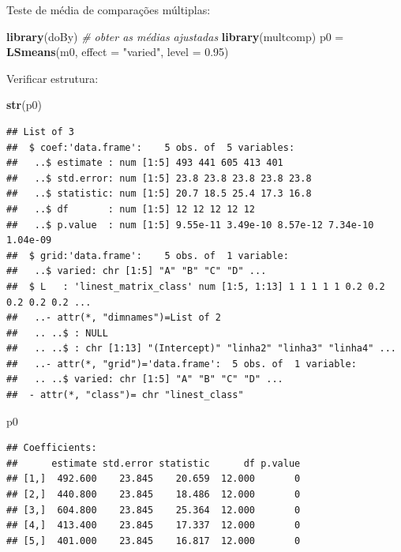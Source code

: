 \documentclass[
]{book}
\newenvironment{Shaded}{\begin{snugshade}}{\end{snugshade}}
\newcommand{\CommentTok}[1]{\textcolor[rgb]{0.56,0.35,0.01}{\textit{#1}}}
\newcommand{\DataTypeTok}[1]{\textcolor[rgb]{0.13,0.29,0.53}{#1}}
\newcommand{\FloatTok}[1]{\textcolor[rgb]{0.00,0.00,0.81}{#1}}
\newcommand{\KeywordTok}[1]{\textcolor[rgb]{0.13,0.29,0.53}{\textbf{#1}}}
\newcommand{\NormalTok}[1]{#1}
\newcommand{\StringTok}[1]{\textcolor[rgb]{0.31,0.60,0.02}{#1}}
\begin{document}
Teste de média de comparações múltiplas:

\begin{Shaded}
\begin{Highlighting}[]
\KeywordTok{library}\NormalTok{(doBy) }\CommentTok{# obter as médias ajustadas }
\KeywordTok{library}\NormalTok{(multcomp)}
\NormalTok{p0 =}\StringTok{ }\KeywordTok{LSmeans}\NormalTok{(m0, }\DataTypeTok{effect =} \StringTok{"varied"}\NormalTok{, }\DataTypeTok{level =} \FloatTok{0.95}\NormalTok{)}
\end{Highlighting}
\end{Shaded}

Verificar estrutura:

\begin{Shaded}
\begin{Highlighting}[]
\KeywordTok{str}\NormalTok{(p0)}
\end{Highlighting}
\end{Shaded}

\begin{verbatim}
## List of 3
##  $ coef:'data.frame':    5 obs. of  5 variables:
##   ..$ estimate : num [1:5] 493 441 605 413 401
##   ..$ std.error: num [1:5] 23.8 23.8 23.8 23.8 23.8
##   ..$ statistic: num [1:5] 20.7 18.5 25.4 17.3 16.8
##   ..$ df       : num [1:5] 12 12 12 12 12
##   ..$ p.value  : num [1:5] 9.55e-11 3.49e-10 8.57e-12 7.34e-10 1.04e-09
##  $ grid:'data.frame':    5 obs. of  1 variable:
##   ..$ varied: chr [1:5] "A" "B" "C" "D" ...
##  $ L   : 'linest_matrix_class' num [1:5, 1:13] 1 1 1 1 1 0.2 0.2 0.2 0.2 0.2 ...
##   ..- attr(*, "dimnames")=List of 2
##   .. ..$ : NULL
##   .. ..$ : chr [1:13] "(Intercept)" "linha2" "linha3" "linha4" ...
##   ..- attr(*, "grid")='data.frame':  5 obs. of  1 variable:
##   .. ..$ varied: chr [1:5] "A" "B" "C" "D" ...
##  - attr(*, "class")= chr "linest_class"
\end{verbatim}

\begin{Shaded}
\begin{Highlighting}[]
\NormalTok{p0}
\end{Highlighting}
\end{Shaded}

\begin{verbatim}
## Coefficients:
##      estimate std.error statistic      df p.value
## [1,]  492.600    23.845    20.659  12.000       0
## [2,]  440.800    23.845    18.486  12.000       0
## [3,]  604.800    23.845    25.364  12.000       0
## [4,]  413.400    23.845    17.337  12.000       0
## [5,]  401.000    23.845    16.817  12.000       0
\end{verbatim}
\end{document}
